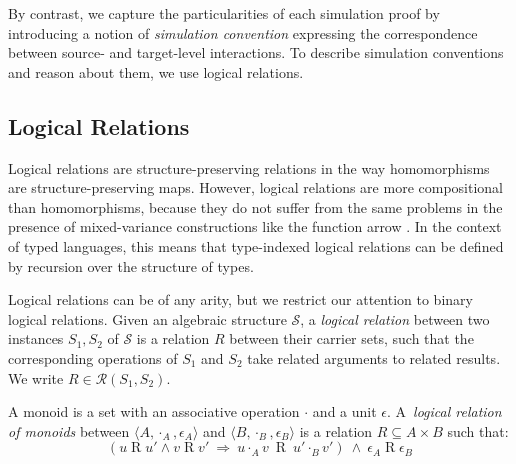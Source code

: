 By contrast,
we capture the particularities of each simulation proof
by introducing a notion of \emph{simulation convention}
expressing the correspondence between
source- and target-level interactions.
To describe simulation conventions
and reason about them,
we use logical relations.



\subsection{Logical Relations} \label{sec:logrel} %

Logical relations are structure-preserving relations
in the way homomorphisms are structure-preserving maps.
However,
logical relations are more compositional than homomorphisms,
because they do not suffer from the same problems
in the presence of mixed-variance constructions
like the function arrow %
\cite{lrp}.
In the context of typed languages,
this means that type-indexed logical relations
can be defined by recursion over the structure of types.


Logical relations can be of any arity,
but
we restrict our attention to
binary logical relations.
Given an algebraic structure $\mathcal{S}$,
a \emph{logical relation}
between two instances $S_1, S_2$ of $\mathcal{S}$
is a relation $R$
between their carrier sets,
such that the corresponding operations of $S_1$ and $S_2$
take related arguments to related results.
We write $R \in \mathcal{R}(S_1, S_2)$.

\begin{example}%
\label{ex:monoid}
A monoid is a set with
an associative operation $\cdot$ and
a unit $\epsilon$.
A~\emph{logical relation of monoids} between
$\langle A, \cdot_A, \epsilon_A \rangle$ and
$\langle B, \cdot_B, \epsilon_B \rangle$
is a relation $R \subseteq A \times B$
such that:
\begin{equation}
\label{eqn:monoidrel}
(u \mathrel{R} u' \wedge v \mathrel{R} v' \: \Rightarrow \:
 u \cdot_A v \: \mathrel{R} \: u' \cdot_B v')
\: \wedge \:
\epsilon_A \mathrel{R} \epsilon_B
\end{equation}
\end{example}

